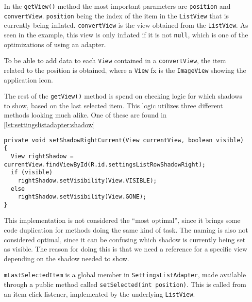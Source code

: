 In the \lstinline|getView()| method the most important parameters are \lstinline|position| and \lstinline|convertView|.
\lstinline|position| being the index of the item in the \lstinline|ListView| that is currently being inflated.
\lstinline|convertView| is the view obtained from the \lstinline|ListView|.
As seen in the example, this view is only inflated if it is not \lstinline|null|, which is one of the optimizations of using an adapter.

To be able to add data to each \lstinline|View| contained in a \lstinline|convertView|, the item related to the position is obtained, where a \lstinline|View| fx is the \lstinline|ImageView| showing the application icon.

The rest of the \lstinline|getView()| method is spend on checking logic for which shadows to show, based on the last selected item.
This logic utilizes three different methods looking much alike.
One of these are found in \cref{lst:settingslistadapter:shadow}

\begin{lstlisting}[caption={One of three methods setting the visibility of shadows related to the selected list item.}, label={lst:settingslistadapter:shadow}]
private void setShadowRightCurrent(View currentView, boolean visible) {
  View rightShadow = currentView.findViewById(R.id.settingsListRowShadowRight);
  if (visible)
    rightShadow.setVisibility(View.VISIBLE);
  else
    rightShadow.setVisibility(View.GONE);
}
\end{lstlisting}

This implementation is not considered the ``most optimal'', since it brings some code duplication for methods doing the same kind of task.
The naming is also not considered optimal, since it can be confusing which shadow is currently being set as visible.
The reason for doing this is that we need a reference for a specific view depending on the shadow needed to show.

\lstinline|mLastSelectedItem| is a global member in \lstinline|SettingsListAdapter|, made available through a public method called \lstinline|setSelected(int position)|.
This is called from an item click listener, implemented by the underlying \lstinline|ListView|.

